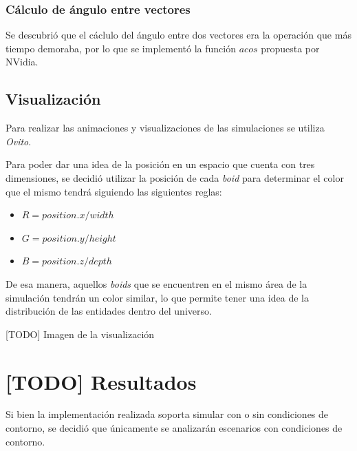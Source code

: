 \documentclass[a4paper]{article}
\begin{document}
            \subsubsection{Cálculo de ángulo entre vectores}
                Se descubrió que el cáclulo del ángulo entre dos vectores era la operación que más tiempo demoraba, por lo que se implementó la función $acos$ propuesta por NVidia\cite{FastAcos}.

        \subsection{Visualización}
            Para realizar las animaciones y visualizaciones de las simulaciones se utiliza \textit{Ovito}.

            Para poder dar una idea de la posición en un espacio que cuenta con tres dimensiones, se decidió utilizar la posición de cada \textit{boid} para determinar el color que el mismo tendrá siguiendo las siguientes reglas:

            \begin{itemize}
                \item $R = position.x / width$
                \item $G = position.y / height$
                \item $B = position.z / depth$
            \end{itemize}

            De esa manera, aquellos \textit{boids} que se encuentren en el mismo área de la simulación tendrán un color similar, lo que permite tener una idea de la distribución de las entidades dentro del universo.

            [TODO] Imagen de la visualización

    \section{[TODO] Resultados}
        Si bien la implementación realizada soporta simular con o sin condiciones de contorno, se decidió que únicamente se analizarán escenarios con condiciones de contorno.
\end{document}
